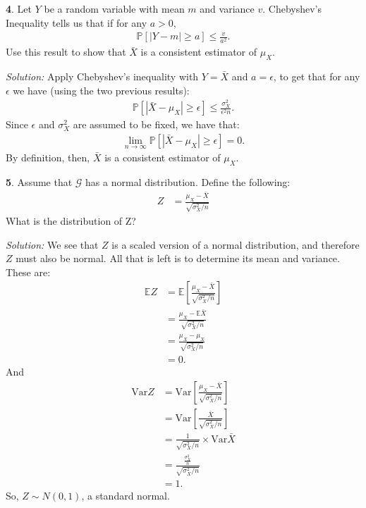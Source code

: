 \documentclass{tufte-handout}
\newcommand{\E}{\mathbb{E}}
\newcommand{\V}{\text{Var}}
\begin{document}
\textbf{4}. Let $Y$ be a random variable with mean $m$ and variance $v$. Chebyshev's
Inequality tells us that if for any $a > 0$,
\begin{align*}
\mathbb{P}[ |Y - m| \geq a] \leq \frac{v}{a^2}.
\end{align*}
Use this result to show that $\bar{X}$ is a consistent estimator of $\mu_X$.

\textit{Solution:} Apply Chebyshev's inequality with $Y = \bar{X}$ and $a = \epsilon$, to get
that for any $\epsilon$ we have (using the two previous results):
\begin{align*}
\mathbb{P}[ |\bar{X} - \mu_X| \geq \epsilon] \leq \frac{\sigma_X^2}{\epsilon^2 n}.
\end{align*}
Since $\epsilon$ and $\sigma_X^2$ are assumed to be fixed, we have that:
\begin{align*}
\lim_{n\rightarrow \infty} \mathbb{P}[ |\bar{X} - \mu_X| \geq \epsilon] = 0.
\end{align*}
By definition, then, $\bar{X}$ is a consistent estimator of $\mu_X$.

\textbf{5}. Assume that $\mathcal{G}$ has a normal distribution. Define the following:
\begin{align*}
Z &= \frac{\mu_X - \bar{X}}{\sqrt{\sigma_X^2 / n}}
\end{align*}
What is the distribution of Z?

\textit{Solution:} We see that $Z$ is a scaled version of a normal distribution, and therefore
$Z$ must also be normal. All that is left is to determine its mean and variance.
These are:
\begin{align*}
\E Z &= \E \left[ \frac{\mu_X - \bar{X}}{\sqrt{\sigma_X^2 / n}} \right] \\
&= \frac{\mu_X - \E\bar{X}}{\sqrt{\sigma_X^2 / n}} \\
&= \frac{\mu_X - \mu_X}{\sqrt{\sigma_X^2 / n}} \\
&= 0.
\end{align*}
And 
\begin{align*}
\V Z &= \V \left[ \frac{\mu_X - \bar{X}}{\sqrt{\sigma_X^2 / n}} \right] \\
&= \V \left[ \frac{\bar{X}}{\sqrt{\sigma_X^2 / n}} \right] \\
&= \frac{1}{\sqrt{\sigma_X^2 / n}} \times \V \bar{X} \\
&= \frac{\frac{\sigma_X^2}{n}}{\sqrt{\sigma_X^2 / n}} \\
&= 1.
\end{align*}
So, $Z \sim N(0, 1)$, a standard normal.
\end{document}
